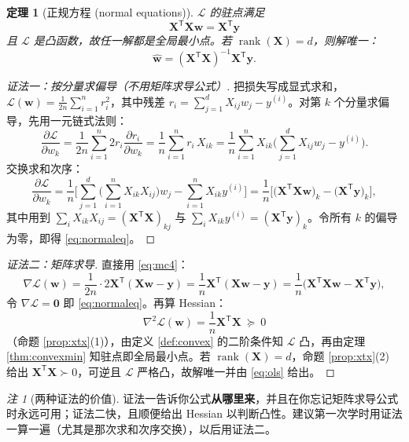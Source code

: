 \documentclass[UTF8,a4paper,11pt]{ctexart}
\theoremstyle{definition}
\theoremstyle{plain}
\newtheorem{theorem}[definition]{定理}
\theoremstyle{remark}
\newtheorem{remark}[definition]{注}
\DeclareMathOperator{\rank}{rank}
\newcommand{\Loss}{\mathcal{L}}
\newcommand{\T}{^{\mathsf{T}}}
\newcommand{\eng}[1]{\textup{(#1)}}
\begin{document}
\begin{theorem}[正规方程 \eng{normal equations}]\label{thm:normaleq}
$\Loss$ 的驻点满足
\begin{equation}\label{eq:normaleq}
  \boxed{\ \bm{X}\T\bm{X}\bm{w}=\bm{X}\T\bm{y}\ }
\end{equation}
且 $\Loss$ 是凸函数，故任一解都是全局最小点。若 $\rank(\bm{X})=d$，则解唯一：
\begin{equation}\label{eq:ols}
  \hat{\bm{w}}=(\bm{X}\T\bm{X})^{-1}\bm{X}\T\bm{y}.
\end{equation}
\end{theorem}

\begin{proof}[证法一：按分量求偏导（不用矩阵求导公式）]
把损失写成显式求和，$\Loss(\bm{w})=\frac{1}{2n}\sum_{i=1}^n r_i^2$，其中残差 $r_i=\sum_{j=1}^d X_{ij}w_j-y^{(i)}$。对第 $k$ 个分量求偏导，先用一元链式法则：
\[
  \frac{\partial\Loss}{\partial w_k}
  =\frac{1}{2n}\sum_{i=1}^{n}2r_i\frac{\partial r_i}{\partial w_k}
  =\frac1n\sum_{i=1}^{n}r_i\,X_{ik}
  =\frac1n\sum_{i=1}^{n}X_{ik}\Big(\sum_{j=1}^{d}X_{ij}w_j-y^{(i)}\Big).
\]
交换求和次序：
\[
  \frac{\partial\Loss}{\partial w_k}
  =\frac1n\Big[\sum_{j=1}^{d}\Big(\sum_{i=1}^{n}X_{ik}X_{ij}\Big)w_j-\sum_{i=1}^{n}X_{ik}y^{(i)}\Big]
  =\frac1n\Big[\big(\bm{X}\T\bm{X}\bm{w}\big)_k-\big(\bm{X}\T\bm{y}\big)_k\Big],
\]
其中用到 $\sum_i X_{ik}X_{ij}=(\bm{X}\T\bm{X})_{kj}$ 与 $\sum_i X_{ik}y^{(i)}=(\bm{X}\T\bm{y})_k$。令所有 $k$ 的偏导为零，即得 \eqref{eq:normaleq}。
\end{proof}

\begin{proof}[证法二：矩阵求导]
直接用 \eqref{eq:mc4}：
\[
  \nabla\Loss(\bm{w})=\frac{1}{2n}\cdot2\bm{X}\T(\bm{X}\bm{w}-\bm{y})=\frac1n\bm{X}\T(\bm{X}\bm{w}-\bm{y})
  =\frac1n\big(\bm{X}\T\bm{X}\bm{w}-\bm{X}\T\bm{y}\big),
\]
令 $\nabla\Loss=\bm{0}$ 即 \eqref{eq:normaleq}。再算 Hessian：
\[
  \nabla^2\Loss(\bm{w})=\frac1n\bm{X}\T\bm{X}\ \succeq\ 0
\]
（命题 \ref{prop:xtx}(1)），由定义 \ref{def:convex} 的二阶条件知 $\Loss$ 凸，再由定理 \ref{thm:convexmin} 知驻点即全局最小点。若 $\rank(\bm{X})=d$，命题 \ref{prop:xtx}(2) 给出 $\bm{X}\T\bm{X}\succ0$，可逆且 $\Loss$ 严格凸，故解唯一并由 \eqref{eq:ols} 给出。
\end{proof}

\begin{remark}[两种证法的价值]
证法一告诉你公式\textbf{从哪里来}，并且在你忘记矩阵求导公式时永远可用；证法二快，且顺便给出 Hessian 以判断凸性。建议第一次学时用证法一算一遍（尤其是那次求和次序交换），以后用证法二。
\end{remark}
\end{document}
